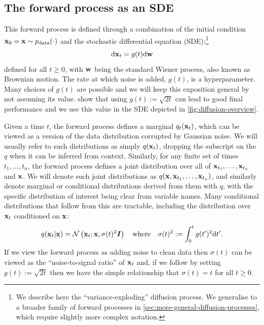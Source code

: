 \subsection{The forward process as an SDE} \label{sec:diffusion-forward-sde}
This forward process is defined through a combination of the initial condition ${\mathbf{x}}_0 = {\mathbf{x}} \sim p_{\rm{data}}(\cdot)$ and the stochastic differential equation (SDE):\footnote{We describe here the ``variance-exploding'' diffusion process. We generalise to a broader family of forward processes in \cref{sec:more-general-diffusion-processes}, which require slightly more complex notation.}
\begin{equation} \label{eq:forward-diffusion}
    \mathrm{d}{\mathbf{x}}_t = g(t) \mathrm{d}{\mathbf{w}}
\end{equation}
defined for all $t \geq 0$, with ${\mathbf{w}}$ being the standard Wiener process, also known as Brownian motion. The rate at which noise is added, $g(t)$, is a hyperparameter. Many choices of $g(t)$ are possible and we will keep this exposition general by not assuming its value. \citet{karras2022elucidating} show that using $g(t) := \sqrt{2t}$ can lead to good final performance and we use this value in the SDE depicted in \cref{fig:diffusion-overview}.

Given a time $t$, the forward process defines a marginal $q_t({\mathbf{x}}_t)$, which can be viewed as a version of the data distribution corrupted by Gaussian noise. We will usually refer to such distributions as simply $q({\mathbf{x}}_t)$, dropping the subscript on the $q$ when it can be inferred from context. Similarly, for any finite set of times $t_1,\ldots,t_n$, the forward process defines a joint distribution over all of ${\mathbf{x}}_{t_1},\ldots,{\mathbf{x}}_{t_n}$ and ${\mathbf{x}}$. We will denote such joint distributions as $q({\mathbf{x}},{\mathbf{x}}_{t_1},\ldots,{\mathbf{x}}_{t_n})$, and similarly denote marginal or conditional distributions derived from them with $q$, with the specific distribution of interest being clear from variable names. Many conditional distributions that follow from this are tractable, including the distribution over ${\mathbf{x}}_t$ conditioned on ${\mathbf{x}}$:
\begin{equation}
    q({\mathbf{x}}_t|{\mathbf{x}}) = {\mathcal{N}} \left( {\mathbf{x}}_t; {\mathbf{x}}, \sigma(t)^2 {\bm{I}} \right) \quad \text{where} \quad \sigma(t)^2 := \int_0^t g(t')^2 \mathrm{d}t'.
\end{equation}
If we view the forward process as adding noise to clean data then $\sigma(t)$ can be viewed as the ``noise-to-signal ratio'' of ${\mathbf{x}}_t$ and, if we follow \citet{karras2022elucidating} by setting $g(t) := \sqrt{2t}$ then we have the simple relationship that $\sigma(t) = t$ for all $t\geq0$.

